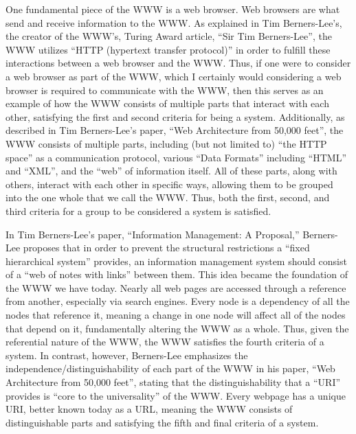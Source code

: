 \documentclass[11pt]{article}
\begin{document}
\par One fundamental piece of the WWW is a web browser. Web browsers are what send and receive information to the WWW. As explained in Tim Berners-Lee's, the creator of the WWW's, Turing Award article, ``Sir Tim Berners-Lee'', the WWW utilizes ``HTTP (hypertext transfer protocol)'' in order to fulfill these interactions between a web browser and the WWW.\cite{Haigh:2016} Thus, if one were to consider a web browser as part of the WWW, which I certainly would considering a web browser is required to communicate with the WWW, then this serves as an example of how the WWW consists of multiple parts that interact with each other, satisfying the first and second criteria for being a system. Additionally, as described in Tim Berners-Lee's paper, ``Web Architecture from 50,000 feet'', the WWW consists of multiple parts, including (but not limited to) ``the HTTP space'' as a communication protocol, various ``Data Formats'' including ``HTML'' and ``XML'', and the ``web'' of information itself.\cite{Berners-Lee:1998} All of these parts, along with others, interact with each other in specific ways, allowing them to be grouped into the one whole that we call the WWW. Thus, both the first, second, and third criteria for a group to be considered a system is satisfied.
\par In Tim Berners-Lee's paper, ``Information Management: A Proposal,'' Berners-Lee proposes that in order to prevent the structural restrictions a ``fixed hierarchical system'' provides, an information management system should consist of a ``web of notes with links'' between them.\cite{Berners-Lee:1990} This idea became the foundation of the WWW we have today. Nearly all web pages are accessed through a reference from another, especially via search engines. Every node is a dependency of all the nodes that reference it, meaning a change in one node will affect all of the nodes that depend on it, fundamentally altering the WWW as a whole. Thus, given the referential nature of the WWW, the WWW satisfies the fourth criteria of a system. 
In contrast, however, Berners-Lee emphasizes the independence/distinguishability of each part of the WWW in his paper, ``Web Architecture from 50,000 feet'', stating that the distinguishability that a ``URI'' provides is ``core to the universality'' of the WWW.\cite{Berners-Lee:1998} Every webpage has a unique URI, better known today as a URL, meaning the WWW consists of distinguishable parts and satisfying the fifth and final criteria of a system.
\end{document}
